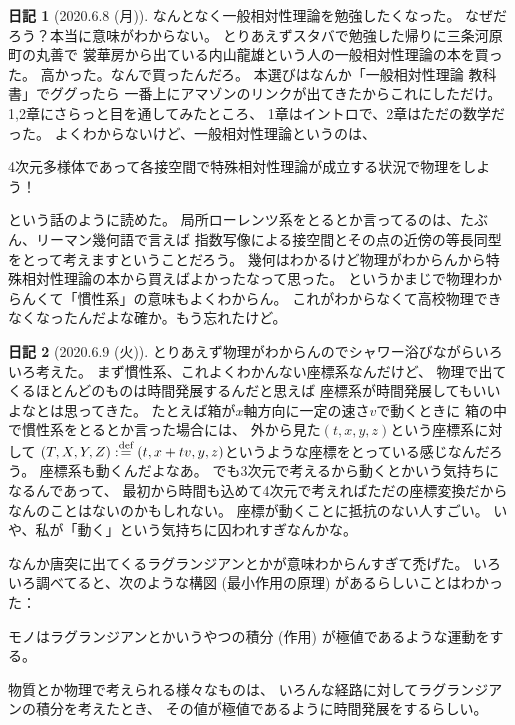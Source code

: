 \documentclass[uplatex]{jsarticle}
\theoremstyle{definition}
\newtheorem*{nikki*}{日記}
\def\dfn{:\overset{\mbox{{\scriptsize def}}}{=}}
\begin{document}
\begin{nikki*}[2020.6.8 (月)]
  なんとなく一般相対性理論を勉強したくなった。
  なぜだろう？本当に意味がわからない。
  とりあえずスタバで勉強した帰りに三条河原町の丸善で
  裳華房から出ている内山龍雄という人の一般相対性理論の本を買った。
  高かった。なんで買ったんだろ。
  本選びはなんか「一般相対性理論 教科書」でググったら
  一番上にアマゾンのリンクが出てきたからこれにしただけ。
  1,2章にさらっと目を通してみたところ、
  1章はイントロで、2章はただの数学だった。
  よくわからないけど、一般相対性理論というのは、
  \begin{center}
    4次元多様体であって各接空間で特殊相対性理論が成立する状況で物理をしよう！
  \end{center}
  という話のように読めた。
  局所ローレンツ系をとるとか言ってるのは、たぶん、リーマン幾何語で言えば
  指数写像による接空間とその点の近傍の等長同型をとって考えますということだろう。
  幾何はわかるけど物理がわからんから特殊相対性理論の本から買えばよかったなって思った。
  というかまじで物理わからんくて「慣性系」の意味もよくわからん。
  これがわからなくて高校物理できなくなったんだよな確か。もう忘れたけど。
\end{nikki*}



\begin{nikki*}[2020.6.9 (火)]
  とりあえず物理がわからんのでシャワー浴びながらいろいろ考えた。
  まず慣性系、これよくわかんない座標系なんだけど、
  物理で出てくるほとんどのものは時間発展するんだと思えば
  座標系が時間発展してもいいよなとは思ってきた。
  たとえば箱が\(x\)軸方向に一定の速さ\(v\)で動くときに
  箱の中で慣性系をとるとか言った場合には、
  外から見た\((t,x,y,z)\)という座標系に対して
  \((T,X,Y,Z)\dfn (t,x+tv,y,z)\)というような座標をとっている感じなんだろう。
  座標系も動くんだよなあ。
  でも3次元で考えるから動くとかいう気持ちになるんであって、
  最初から時間も込めて4次元で考えればただの座標変換だからなんのことはないのかもしれない。
  座標が動くことに抵抗のない人すごい。
  いや、私が「動く」という気持ちに囚われすぎなんかな。

  なんか唐突に出てくるラグランジアンとかが意味わからんすぎて禿げた。
  いろいろ調べてると、次のような構図 (最小作用の原理) があるらしいことはわかった：
  \begin{center}
    モノはラグランジアンとかいうやつの積分 (作用) が極値であるような運動をする。
  \end{center}
  物質とか物理で考えられる様々なものは、
  いろんな経路に対してラグランジアンの積分を考えたとき、
  その値が極値であるように時間発展をするらしい。
\end{nikki*}
\end{document}
